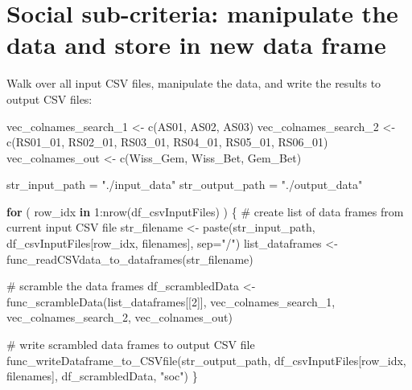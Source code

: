 \documentclass[
]{article}
\newenvironment{Shaded}{\begin{snugshade}}{\end{snugshade}}
\newcommand{\AttributeTok}[1]{\textcolor[rgb]{0.00,0.34,0.68}{#1}}
\newcommand{\CommentTok}[1]{\textcolor[rgb]{0.54,0.53,0.53}{#1}}
\newcommand{\ControlFlowTok}[1]{\textcolor[rgb]{0.12,0.11,0.11}{\textbf{#1}}}
\newcommand{\DecValTok}[1]{\textcolor[rgb]{0.69,0.50,0.00}{#1}}
\newcommand{\FunctionTok}[1]{\textcolor[rgb]{0.39,0.29,0.61}{#1}}
\newcommand{\NormalTok}[1]{\textcolor[rgb]{0.12,0.11,0.11}{#1}}
\newcommand{\OtherTok}[1]{\textcolor[rgb]{0.00,0.43,0.16}{#1}}
\newcommand{\SpecialCharTok}[1]{\textcolor[rgb]{0.24,0.68,0.91}{#1}}
\newcommand{\StringTok}[1]{\textcolor[rgb]{0.75,0.01,0.01}{#1}}
\begin{document}
\hypertarget{social-sub-criteria-manipulate-the-data-and-store-in-new-data-frame}{%
\section{Social sub-criteria: manipulate the data and store in new data
frame}\label{social-sub-criteria-manipulate-the-data-and-store-in-new-data-frame}}

Walk over all input CSV files, manipulate the data, and write the
results to output CSV files:

\begin{Shaded}
\begin{Highlighting}[]
\NormalTok{vec\_colnames\_search\_1 }\OtherTok{\textless{}{-}} \FunctionTok{c}\NormalTok{(}\StringTok{\textquotesingle{}AS01\textquotesingle{}}\NormalTok{, }\StringTok{\textquotesingle{}AS02\textquotesingle{}}\NormalTok{, }\StringTok{\textquotesingle{}AS03\textquotesingle{}}\NormalTok{)}
\NormalTok{vec\_colnames\_search\_2 }\OtherTok{\textless{}{-}} \FunctionTok{c}\NormalTok{(}\StringTok{\textquotesingle{}RS01\_01\textquotesingle{}}\NormalTok{, }\StringTok{\textquotesingle{}RS02\_01\textquotesingle{}}\NormalTok{, }\StringTok{\textquotesingle{}RS03\_01\textquotesingle{}}\NormalTok{, }\StringTok{\textquotesingle{}RS04\_01\textquotesingle{}}\NormalTok{, }\StringTok{\textquotesingle{}RS05\_01\textquotesingle{}}\NormalTok{, }\StringTok{\textquotesingle{}RS06\_01\textquotesingle{}}\NormalTok{)}
\NormalTok{vec\_colnames\_out }\OtherTok{\textless{}{-}} \FunctionTok{c}\NormalTok{(}\StringTok{\textquotesingle{}Wiss\_Gem\textquotesingle{}}\NormalTok{, }\StringTok{\textquotesingle{}Wiss\_Bet\textquotesingle{}}\NormalTok{, }\StringTok{\textquotesingle{}Gem\_Bet\textquotesingle{}}\NormalTok{)}

\NormalTok{str\_input\_path }\OtherTok{=} \StringTok{"./input\_data"}
\NormalTok{str\_output\_path }\OtherTok{=} \StringTok{"./output\_data"}

\ControlFlowTok{for}\NormalTok{ ( row\_idx }\ControlFlowTok{in} \DecValTok{1}\SpecialCharTok{:}\FunctionTok{nrow}\NormalTok{(df\_csvInputFiles) ) \{}
  \CommentTok{\# create list of data frames from current input CSV file}
\NormalTok{  str\_filename }\OtherTok{\textless{}{-}} \FunctionTok{paste}\NormalTok{(str\_input\_path, df\_csvInputFiles[row\_idx, filenames], }\AttributeTok{sep=}\StringTok{"/"}\NormalTok{)}
\NormalTok{  list\_dataframes }\OtherTok{\textless{}{-}} \FunctionTok{func\_readCSVdata\_to\_dataframes}\NormalTok{(str\_filename)}
  
  \CommentTok{\# scramble the data frames}
\NormalTok{  df\_scrambledData }\OtherTok{\textless{}{-}} \FunctionTok{func\_scrambleData}\NormalTok{(list\_dataframes[[}\DecValTok{2}\NormalTok{]], vec\_colnames\_search\_1, vec\_colnames\_search\_2, vec\_colnames\_out)}
  
  \CommentTok{\# write scrambled data frames to output CSV file}
  \FunctionTok{func\_writeDataframe\_to\_CSVfile}\NormalTok{(str\_output\_path, df\_csvInputFiles[row\_idx, filenames], df\_scrambledData, }\StringTok{"soc"}\NormalTok{)}
\NormalTok{\}}
\end{Highlighting}
\end{Shaded}
\end{document}
